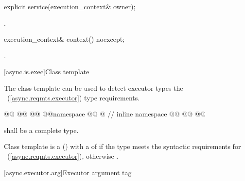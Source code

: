 %
\begin{itemdecl}
explicit service(execution_context& owner);
\end{itemdecl}

\begin{itemdescr}
\pnum
\postconditions {}.
\end{itemdescr}

%
\begin{itemdecl}
execution_context& context() noexcept;
\end{itemdecl}

\begin{itemdescr}
\pnum
\returns {}.
\end{itemdescr}



[async.is.exec]{Class template }

%
\pnum
The class template  can be used to detect executor types  the ~(\ref{async.reqmts.executor}) type requirements.

\begin{codeblock}
@@
@@
@@
@@namespace @@ @ // inline namespace \namespacever
@@
@@
@@
\end{codeblock}

\pnum
{}  shall be a complete type.

\pnum
Class template  is a  () with a  of  if the type  meets the syntactic requirements for ~(\ref{async.reqmts.executor}), otherwise .



[async.executor.arg]{Executor argument tag}


